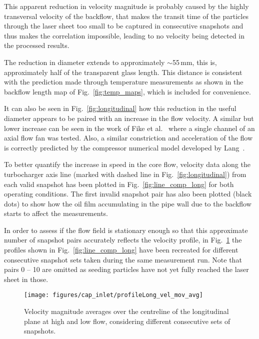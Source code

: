 This apparent reduction in velocity magnitude is probably caused by  the highly transversal velocity of the backflow, that makes the transit time of the particles through the laser sheet too small to be captured in consecutive snapshots and thus makes the correlation impossible, leading to no velocity being detected in the processed results.

The reduction in diameter extends to approximately $\sim$55\,mm, this is, approximately half of the transparent glass length. This distance is consistent with the prediction made through temperature measurements as shown in the backflow length map of Fig.~\ref{fig:temp_maps}, which is included for convenience.

It can also be seen in Fig.~\ref{fig:longitudinal} how this reduction in the useful diameter appears to be paired with an increase in the flow velocity. A similar but lower increase can be seen in the work of Fike et al.~\cite{fike2014visualisation} where a single channel of an axial flow fan was tested. Also, a similar constriction and acceleration of the flow is correctly predicted by the compressor numerical model developed by Lang~\cite{lang2011contribucion}.

To better quantify the increase in speed in the core flow, velocity data along the turbocharger axis line (marked with dashed line in Fig.~\ref{fig:longitudinal}) from each valid snapshot has been plotted in Fig.~\ref{fig:line_comp_long} for both operating conditions. The first invalid snapshot pair has also been plotted (black dots) to show how the oil film accumulating in the pipe wall due to the backflow starts to affect the measurements.

In order to assess if the flow field is stationary enough so that this approximate number of snapshot pairs accurately reflects the velocity profile, in Fig.~\ref{fig:line_comp_long_mov_avg} the profiles shown in Fig.~\ref{fig:line_comp_long} have been recreated for different consecutive snapshot sets taken during the same measurement run. Note that pairs 0 -- 10 are omitted as seeding particles have not yet fully reached the laser sheet in those.

\begin{figure}[t!]
\centering
\texttt{[image: figures/cap\_inlet/profileLong\_vel\_mov\_avg]}
\caption[Velocity magnitude average evolution]{Velocity magnitude averages over the centreline of the longitudinal plane at high and low flow, considering different consecutive sets of snapshots.}
\label{fig:line_comp_long_mov_avg}
\end{figure}


